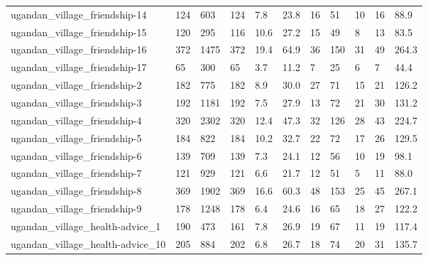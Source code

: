 \begin{longtable}{lllllllllll}
 ugandan\_village\_friendship-14                      & 124        & 603       & 124   & 7.8    & 23.8   & 16    & 51     & 10     & 16     & 88.9    \\
 ugandan\_village\_friendship-15                      & 120        & 295       & 116   & 10.6   & 27.2   & 15    & 49     & 8      & 13     & 83.5    \\
 ugandan\_village\_friendship-16                      & 372        & 1475      & 372   & 19.4   & 64.9   & 36    & 150    & 31     & 49     & 264.3   \\
 ugandan\_village\_friendship-17                      & 65         & 300       & 65    & 3.7    & 11.2   & 7     & 25     & 6      & 7      & 44.4    \\
 ugandan\_village\_friendship-2                       & 182        & 775       & 182   & 8.9    & 30.0   & 27    & 71     & 15     & 21     & 126.2   \\
 ugandan\_village\_friendship-3                       & 192        & 1181      & 192   & 7.5    & 27.9   & 13    & 72     & 21     & 30     & 131.2   \\
 ugandan\_village\_friendship-4                       & 320        & 2302      & 320   & 12.4   & 47.3   & 32    & 126    & 28     & 43     & 224.7   \\
 ugandan\_village\_friendship-5                       & 184        & 822       & 184   & 10.2   & 32.7   & 22    & 72     & 17     & 26     & 129.5   \\
 ugandan\_village\_friendship-6                       & 139        & 709       & 139   & 7.3    & 24.1   & 12    & 56     & 10     & 19     & 98.1    \\
 ugandan\_village\_friendship-7                       & 121        & 929       & 121   & 6.6    & 21.7   & 12    & 51     & 5      & 11     & 88.0    \\
 ugandan\_village\_friendship-8                       & 369        & 1902      & 369   & 16.6   & 60.3   & 48    & 153    & 25     & 45     & 267.1   \\
 ugandan\_village\_friendship-9                       & 178        & 1248      & 178   & 6.4    & 24.6   & 16    & 65     & 18     & 27     & 122.2   \\
 ugandan\_village\_health-advice\_1                    & 190        & 473       & 161   & 7.8    & 26.9   & 19    & 67     & 11     & 19     & 117.4   \\
 ugandan\_village\_health-advice\_10                   & 205        & 884       & 202   & 6.8    & 26.7   & 18    & 74     & 20     & 31     & 135.7   \\

\end{longtable}
